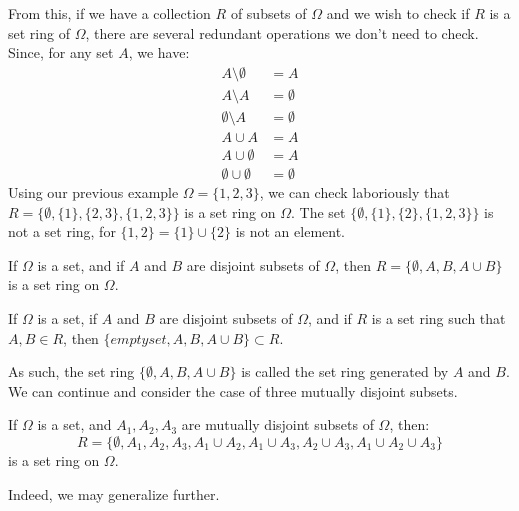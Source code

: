         From this, if we have a collection $R$ of subsets of
        $\Omega$ and we wish to check if $R$ is a set ring
        of $\Omega$, there are several redundant operations
        we don't need to check. Since, for any set $A$,
        we have:
        \begin{align}
            A\setminus\emptyset&=A\\
            A\setminus{A}&=\emptyset\\
            \emptyset\setminus{A}&=\emptyset\\
            A\cup{A}&=A\\
            A\cup\emptyset&=A\\
            \emptyset\cup\emptyset&=\emptyset
        \end{align}
        Using our previous example $\Omega=\{1,2,3\}$,
        we can check laboriously that
        $R=\{\emptyset,\{1\},\{2,3\},\{1,2,3\}\}$ is a
        set ring on $\Omega$. The set
        $\{\emptyset,\{1\},\{2\},\{1,2,3\}\}$ is not
        a set ring, for $\{1,2\}=\{1\}\cup\{2\}$ is not
        an element.
        \begin{theorem}
            If $\Omega$ is a set, and if $A$ and $B$ are
            disjoint subsets of $\Omega$, then
            $R=\{\emptyset,A,B,A\cup{B}\}$ is a set ring
            on $\Omega$.
        \end{theorem}
        \begin{theorem}
            If $\Omega$ is a set, if $A$ and $B$ are
            disjoint subsets of $\Omega$, and if
            $R$ is a set ring such that $A,B\in{R}$,
            then $\{emptyset,A,B,A\cup{B}\}\subset{R}$.
        \end{theorem}
        As such, the set ring $\{\emptyset,A,B,A\cup{B}\}$
        is called the set ring generated by $A$ and $B$. We
        can continue and consider the case of three mutually
        disjoint subsets.
        \begin{theorem}
            If $\Omega$ is a set, and $A_{1},A_{2},A_{3}$ are
            mutually disjoint subsets of $\Omega$, then:
            \begin{equation}
                R=\{\emptyset,A_{1},A_{2},A_{3},
                    A_{1}\cup{A}_{2},A_{1}\cup{A}_{3},
                    A_{2}\cup{A}_{3},
                    A_{1}\cup{A}_{2}\cup{A}_{3}\}
            \end{equation}
            is a set ring on $\Omega$.
        \end{theorem}
        Indeed, we may generalize further.
